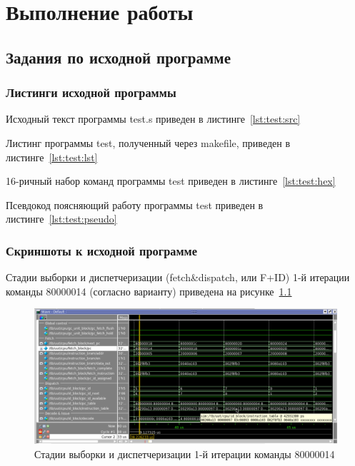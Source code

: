 \chapter{Выполнение работы}

\section{Задания по исходной программе}

\subsection{Листинги исходной программы}

Исходный текст программы test.s приведен в листинге~\ref{lst:test:src}


\clearpage

Листинг программы test, полученный через makefile, приведен в листинге~\ref{lst:test:lst}



16-ричный набор команд программы test приведен в листинге~\ref{lst:test:hex}



Псевдокод поясняющий работу программы test приведен в листинге~\ref{lst:test:pseudo}


\clearpage

\subsection{Скриншоты к исходной программе}

Стадии выборки и диспетчеризации (fetch\&dispatch, или F+ID) 1-й итерации команды 80000014 (согласно варианту) приведена на рисунке~\ref{img:task2}

\begin{figure}[H]
	\centering
	\includegraphics[width=1\textwidth]{images/task2.png}
	\caption{Стадии выборки и диспетчеризации 1-й итерации команды 80000014}
	\label{img:task2}
\end{figure}

